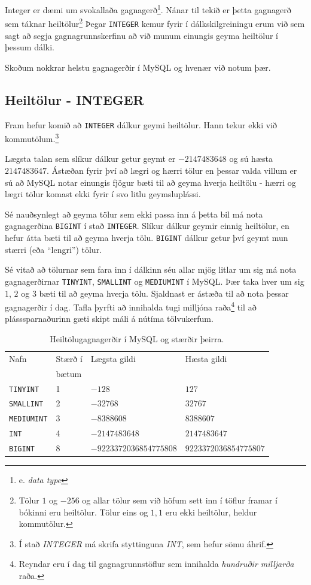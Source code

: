 Integer er dæmi um svokallaða gagnagerð\footnote{e. \emph{data type}}. Nánar til tekið er þetta gagnagerð sem táknar heiltölur\footnote{Tölur  $1$ og $-256$ og allar tölur sem við höfum sett inn í töflur framar í bókinni eru heiltölur. Tölur eins og $1,1$ eru ekki heiltölur, heldur kommutölur.} Þegar \verb|INTEGER| kemur fyrir í dálkskilgreiningu erum við sem sagt að segja gagnagrunnskerfinu að við munum einungis geyma heiltölur í þessum dálki.

Skoðum nokkrar helstu gagnagerðir í MySQL og hvenær við notum þær.
\subsection{Heiltölur - INTEGER}
Fram hefur komið að \verb|INTEGER| dálkur geymi heiltölur. Hann tekur ekki við kommutölum.\footnote{Í stað \emph{INTEGER} má skrifa styttinguna \emph{INT}, sem hefur sömu áhrif.}

Lægsta talan sem slíkur dálkur getur geymt er $-2147483648$ og sú hæsta $2147483647$. Ástæðan fyrir því að lægri og hærri tölur en þessar valda villum er sú að MySQL notar einungis fjögur bæti til að geyma hverja heiltölu - hærri og lægri tölur komast ekki fyrir í svo litlu geymsluplássi.

Sé nauðsynlegt að geyma tölur sem ekki passa inn á þetta bil má nota gagnagerðina \verb|BIGINT| í stað \verb|INTEGER|. Slíkur dálkur geymir einnig heiltölur, en hefur átta bæti til að geyma hverja tölu. \verb|BIGINT| dálkur getur því geymt mun stærri (eða ``lengri'') tölur.

Sé vitað að tölurnar sem fara inn í dálkinn séu allar mjög litlar um sig má nota gagnagerðirnar \verb|TINYINT|, \verb|SMALLINT| og \verb|MEDIUMINT| í MySQL. Þær taka hver um sig $1$, $2$ og $3$ bæti til að geyma hverja tölu. Sjaldnast er ástæða til að nota þessar gagnagerðir í dag. Tafla þyrfti að innihalda tugi milljóna raða\footnote{Reyndar eru í dag til gagnagrunnstöflur sem innihalda \emph{hundruðir milljarða} raða.} til að plásssparnaðurinn gæti skipt máli á nútíma tölvukerfum.

\begin{table}
\centering
\caption[Heiltöludálkar]{Heiltölugagnagerðir í MySQL og stærðir þeirra.}
\label{tafla:heiltolur}
\begin{tabular}{llll}
\toprule
Nafn&Stærð í&Lægsta gildi&Hæsta gildi\\
&bætum&&\\
\midrule
\verb|TINYINT|&1&$-128$&$127$\\
\verb|SMALLINT|&2&$-32768$&$32767$\\
\verb|MEDIUMINT|&3&$-8388608$&$8388607$\\
\verb|INT|&4&$-2147483648$&$2147483647$\\
\verb|BIGINT|&8&$-9223372036854775808$&$9223372036854775807$\\
\bottomrule
\end{tabular}
\end{table}

